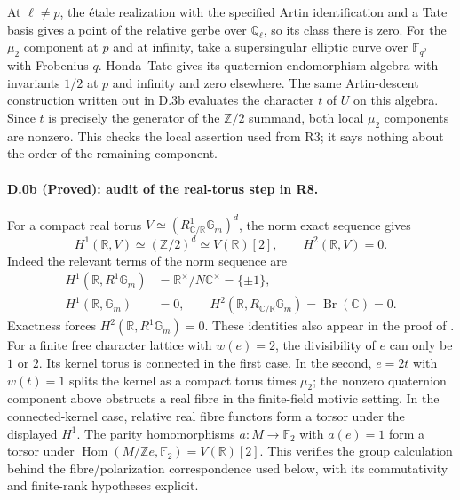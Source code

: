 At $\ell\ne p$, the \'etale realization with the specified Artin
identification and a Tate basis gives a point of the relative gerbe over
$\mathbb Q_\ell$, so its class there is zero. For the $\mu_2$ component
at $p$ and at infinity, take a supersingular elliptic curve over
$\mathbb F_{q^2}$ with Frobenius $q$. Honda--Tate gives its quaternion
endomorphism algebra with invariants $1/2$ at $p$ and infinity and
zero elsewhere. The same Artin-descent construction written out in
D.3b evaluates the character $t$ of $U$ on this algebra. Since $t$
is precisely the generator of the $\mathbb Z/2$ summand, both local
$\mu_2$ components are nonzero. This checks the local assertion used
from R3; it says nothing about the order of the remaining component.

\paragraph{D.0b (Proved): audit of the real-torus step in R8.}
For a compact real torus $V\simeq
(R^1_{\mathbb C/\mathbb R}\mathbb G_m)^d$, the norm exact sequence gives
\[
 H^1(\mathbb R,V)\simeq(\mathbb Z/2)^d\simeq V(\mathbb R)[2],
 \qquad H^2(\mathbb R,V)=0.
\]
Indeed the relevant terms of the norm sequence are
\[
 \begin{aligned}
 H^1(\mathbb R,R^1\mathbb G_m)
   &=\mathbb R^\times/N\mathbb C^\times=\{\pm1\},\\
 H^1(\mathbb R,\mathbb G_m)&=0,\qquad
 H^2(\mathbb R,R_{\mathbb C/\mathbb R}\mathbb G_m)
   =\operatorname{Br}(\mathbb C)=0 .
 \end{aligned}
\]
Exactness forces $H^2(\mathbb R,R^1\mathbb G_m)=0$.
These identities also appear in
the proof of \citet[Proposition 2.42]{D_Milne1994}.
For a finite free character lattice with $w(e)=2$, the divisibility
of $e$ can only be $1$ or $2$. Its kernel torus is connected in the
first case. In the second, $e=2t$ with $w(t)=1$ splits the kernel
as a compact torus times $\mu_2$; the nonzero quaternion component
above obstructs a real fibre in the finite-field motivic setting.
In the connected-kernel case, relative real fibre functors form a
torsor under the displayed $H^1$. The parity homomorphisms
$a:M\to\mathbb F_2$ with $a(e)=1$ form a torsor under
$\operatorname{Hom}(M/\mathbb Ze,\mathbb F_2)=V(\mathbb R)[2]$.
This verifies the group calculation behind the fibre/polarization
correspondence used below, with its commutativity and finite-rank
hypotheses explicit.

